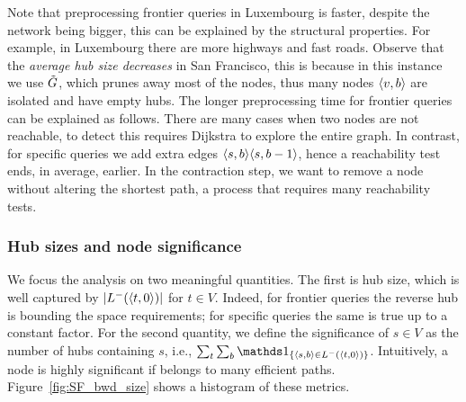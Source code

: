 Note that preprocessing frontier queries in Luxembourg is faster, despite the network being bigger, this can be explained by the structural properties.
For example, in Luxembourg there are more highways and fast roads.
Observe that the \emph{average hub size decreases} in San Francisco, this is because in this instance we use $\tilde G$, which prunes away most of the nodes, thus many nodes $\langle v,b\rangle$ are isolated and have empty hubs.
The longer preprocessing time for frontier queries can be explained as follows.
There are many cases when two nodes are not reachable, to detect this requires Dijkstra to explore the entire graph.
In contrast, for specific queries we add extra edges $\langle s,b\rangle\langle s,b-1\rangle$, hence a reachability test ends, in average, earlier.
In the contraction step, we want to remove a node without altering the shortest path, a process that requires many reachability tests.


\subsubsection{Hub sizes and node significance}

We focus the analysis on two meaningful quantities.
The first is hub size, which is well captured by  $\lvert L^-(\langle t,0\rangle)\rvert$ for $t\in V$.
Indeed, for frontier queries the reverse hub is bounding the space requirements; for specific queries the same is true up to a constant factor.
For the second quantity, we define the significance of $s\in V$ as the number of hubs containing $s$, i.e., $\sum_t\sum_b\In{\pp{s,b}\in \Lb(\pp{t,0})}$.
Intuitively, a node is highly significant if belongs to many efficient paths.
Figure~\ref{fig:SF_bwd_size} shows a histogram of these metrics. 

